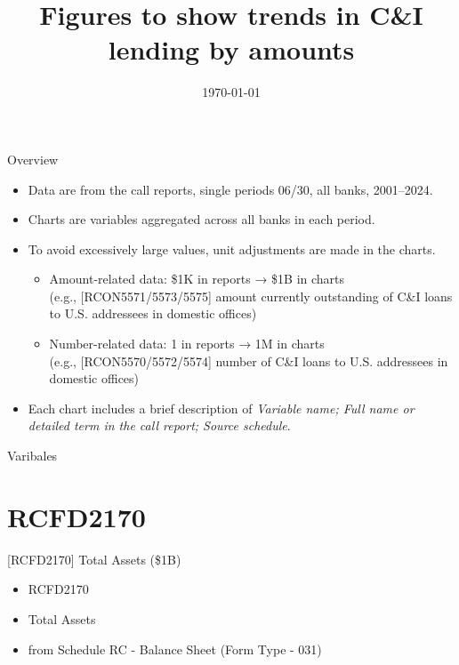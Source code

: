 \documentclass{beamer}
\title{Figures to show trends in C\&I lending by amounts}
\date{\today}
\begin{document}
\begin{frame}
  \titlepage
\end{frame}

\begin{frame}{Overview}
\begin{itemize}
    \item Data are from the call reports, single periods 06/30, all banks, 2001–2024.
    \item Charts are variables aggregated across all banks in each period.
    \item To avoid excessively large values, unit adjustments are made in the charts.
    \begin{itemize}
        \item Amount-related data: \$1K in reports → \$1B in charts \\
        (e.g., [RCON5571/5573/5575] amount currently outstanding of C\&I loans to U.S. addressees in domestic offices)
        
        \item Number-related data: 1 in reports → 1M in charts \\
        (e.g., [RCON5570/5572/5574] number of C\&I loans to U.S. addressees in domestic offices)
    \end{itemize}
    \item Each chart includes a brief description of \textit{Variable name; Full name or detailed term in the call report; Source schedule}.
\end{itemize}
\end{frame}

\begin{frame}{Varibales}
  \tableofcontents
\end{frame}

\section{RCFD2170}
\begin{frame}{[RCFD2170] Total Assets (\$1B)}
\begin{itemize}
    \item RCFD2170
    \item Total Assets
    \item from Schedule RC - Balance Sheet (Form Type - 031)
\end{itemize}
\end{frame}
\end{document}
